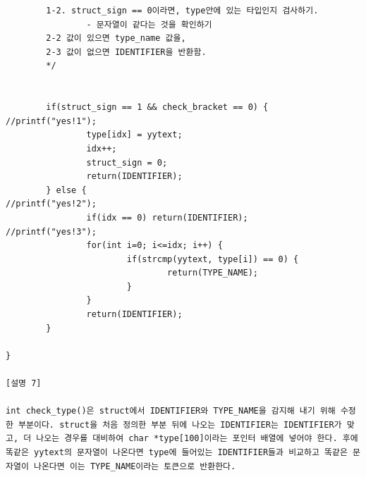 \documentclass{article}
\begin{document}
\begin{verbatim}
        1-2. struct_sign == 0이라면, type안에 있는 타입인지 검사하기.
                - 문자열이 같다는 것을 확인하기
        2-2 값이 있으면 type_name 값을,
        2-3 값이 없으면 IDENTIFIER을 반환함.
        */
        
        
        if(struct_sign == 1 && check_bracket == 0) {
//printf("yes!1");
                type[idx] = yytext;
                idx++;
                struct_sign = 0;
                return(IDENTIFIER);
        } else {
//printf("yes!2");
                if(idx == 0) return(IDENTIFIER); 
//printf("yes!3");
                for(int i=0; i<=idx; i++) {
                        if(strcmp(yytext, type[i]) == 0) {
                                return(TYPE_NAME);
                        }
                }
                return(IDENTIFIER);        
        }        
        
}

[설명 7]

int check_type()은 struct에서 IDENTIFIER와 TYPE_NAME을 감지해 내기 위해 수정한 부분이다. struct을 처음 정의한 부분 뒤에 나오는 IDENTIFIER는 IDENTIFIER가 맞고, 더 나오는 경우를 대비하여 char *type[100]이라는 포인터 배열에 넣어야 한다. 후에 똑같은 yytext의 문자열이 나온다면 type에 들어있는 IDENTIFIER들과 비교하고 똑같은 문자열이 나온다면 이는 TYPE_NAME이라는 토큰으로 반환한다.

\end{verbatim}

\newpage
\end{document}
